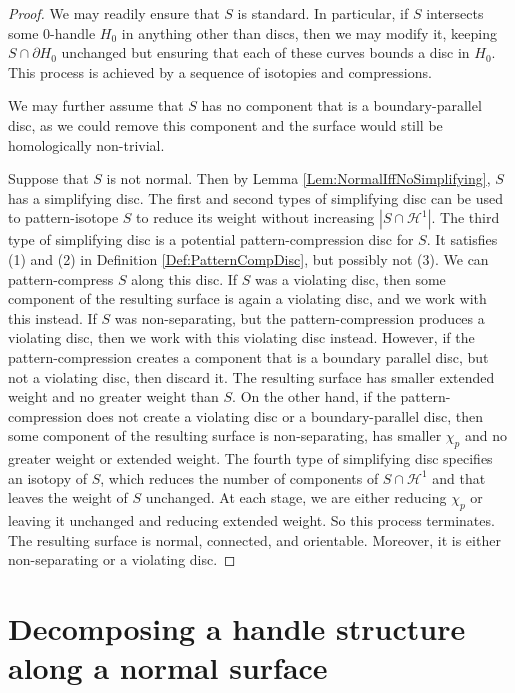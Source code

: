 \documentclass[oneside]{amsart}
\numberwithin{equation}{section}
\theoremstyle{plain}
\theoremstyle{definition}
\newcommand{\calH}{\mathcal{H}}
\begin{document}
\begin{proof}
We may readily ensure that $S$ is standard. In particular, if $S$ intersects some 0-handle $H_0$ in anything other than discs, then we may modify it, keeping $S \cap \partial H_0$ unchanged but ensuring that each of these curves bounds a disc in $H_0$. This process is achieved by a sequence of isotopies and compressions.

We may further assume that $S$ has no component that is a boundary-parallel disc, as we could remove this component and the surface would still be homologically non-trivial. 

Suppose that $S$ is not normal. Then by Lemma \ref{Lem:NormalIffNoSimplifying}, $S$ has a simplifying disc. The first and second types of simplifying disc can be used to pattern-isotope $S$ to reduce its weight without increasing $|S \cap \mathcal{H}^1|$. The third type of simplifying disc is a potential pattern-compression disc for $S$. It satisfies (1) and (2) in Definition \ref{Def:PatternCompDisc}, but possibly not (3).
We can pattern-compress $S$ along this disc. If $S$ was a violating disc, then some component of the resulting surface is again a violating disc, and we work with this instead. If $S$ was non-separating, but the pattern-compression produces a violating disc, then we work with this violating disc instead. However, if the pattern-compression creates a component that is a boundary parallel disc, but not a violating disc, then discard it. The resulting surface has smaller extended weight and no greater weight than $S$. On the other hand, if the pattern-compression does not create a violating disc or a boundary-parallel disc, then some component of the resulting surface is non-separating, has smaller $\chi_p$ and no greater weight or extended weight. The fourth type of simplifying disc specifies an isotopy of $S$, which reduces the number of components of $S \cap \calH^1$ and that leaves the weight of $S$ unchanged. At each stage, we are either reducing $\chi_p$ or leaving it unchanged and reducing extended weight. So this process terminates. The resulting surface is normal, connected, and orientable. Moreover, it is either non-separating or a violating disc.
\end{proof}

\section{Decomposing a handle structure along a normal surface}
\label{Sec:DecomposingHS}
\end{document}

